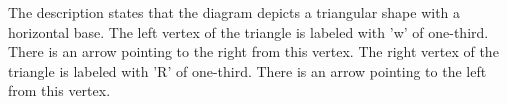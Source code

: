 The description states that the diagram depicts a triangular shape with a horizontal base. The left vertex of the triangle is labeled with 'w' of one-third. There is an arrow pointing to the right from this vertex. The right vertex of the triangle is labeled with 'R' of one-third. There is an arrow pointing to the left from this vertex.
